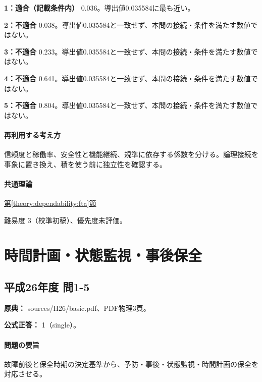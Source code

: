 \noindent\textbf{1：適合（記載条件内）} 0.036。導出値0.035584に最も近い。\par

\noindent\textbf{2：不適合} 0.038。導出値0.035584と一致せず、本問の接続・条件を満たす数値ではない。\par

\noindent\textbf{3：不適合} 0.233。導出値0.035584と一致せず、本問の接続・条件を満たす数値ではない。\par

\noindent\textbf{4：不適合} 0.641。導出値0.035584と一致せず、本問の接続・条件を満たす数値ではない。\par

\noindent\textbf{5：不適合} 0.804。導出値0.035584と一致せず、本問の接続・条件を満たす数値ではない。\par

\paragraph{再利用する考え方} 信頼度と稼働率、安全性と機能継続、規準に依存する係数を分ける。論理接続を事象に置き換え、積を使う前に独立性を確認する。

\paragraph{共通理論} \hyperref[theory:dependability:fta]{第\ref*{theory:dependability:fta}節}

\par 難易度 3（校準初稿）、優先度未評価。

\section{時間計画・状態監視・事後保全}

\subsection{平成26年度 問1-5}
\label{q:h26-reg-basic-1-5}

\noindent\textbf{原典：} sources/H26/basic.pdf、PDF物理3頁。

\textbf{公式正答：} 1（single）。

\paragraph{問題の要旨} 故障前後と保全時期の決定基準から、予防・事後・状態監視・時間計画の保全を対応させる。

